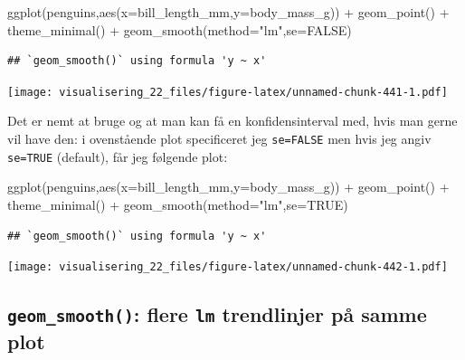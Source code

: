 \documentclass[
]{book}
\newenvironment{Shaded}{\begin{snugshade}}{\end{snugshade}}
\newcommand{\AttributeTok}[1]{\textcolor[rgb]{0.77,0.63,0.00}{#1}}
\newcommand{\ConstantTok}[1]{\textcolor[rgb]{0.00,0.00,0.00}{#1}}
\newcommand{\FunctionTok}[1]{\textcolor[rgb]{0.00,0.00,0.00}{#1}}
\newcommand{\NormalTok}[1]{#1}
\newcommand{\SpecialCharTok}[1]{\textcolor[rgb]{0.00,0.00,0.00}{#1}}
\newcommand{\StringTok}[1]{\textcolor[rgb]{0.31,0.60,0.02}{#1}}
\begin{document}
\begin{Shaded}
\begin{Highlighting}[]
\FunctionTok{ggplot}\NormalTok{(penguins,}\FunctionTok{aes}\NormalTok{(}\AttributeTok{x=}\NormalTok{bill\_length\_mm,}\AttributeTok{y=}\NormalTok{body\_mass\_g)) }\SpecialCharTok{+} 
  \FunctionTok{geom\_point}\NormalTok{() }\SpecialCharTok{+} 
  \FunctionTok{theme\_minimal}\NormalTok{() }\SpecialCharTok{+} 
  \FunctionTok{geom\_smooth}\NormalTok{(}\AttributeTok{method=}\StringTok{"lm"}\NormalTok{,}\AttributeTok{se=}\ConstantTok{FALSE}\NormalTok{)}
\end{Highlighting}
\end{Shaded}

\begin{verbatim}
## `geom_smooth()` using formula 'y ~ x'
\end{verbatim}

\texttt{[image: visualisering\_22\_files/figure-latex/unnamed-chunk-441-1.pdf]}

Det er nemt at bruge og at man kan få en konfidensinterval med, hvis man gerne vil have den: i ovenstående plot specificeret jeg \texttt{se=FALSE} men hvis jeg angiv \texttt{se=TRUE} (default), får jeg følgende plot:

\begin{Shaded}
\begin{Highlighting}[]
\FunctionTok{ggplot}\NormalTok{(penguins,}\FunctionTok{aes}\NormalTok{(}\AttributeTok{x=}\NormalTok{bill\_length\_mm,}\AttributeTok{y=}\NormalTok{body\_mass\_g)) }\SpecialCharTok{+} 
  \FunctionTok{geom\_point}\NormalTok{() }\SpecialCharTok{+} 
  \FunctionTok{theme\_minimal}\NormalTok{() }\SpecialCharTok{+} 
  \FunctionTok{geom\_smooth}\NormalTok{(}\AttributeTok{method=}\StringTok{"lm"}\NormalTok{,}\AttributeTok{se=}\ConstantTok{TRUE}\NormalTok{)}
\end{Highlighting}
\end{Shaded}

\begin{verbatim}
## `geom_smooth()` using formula 'y ~ x'
\end{verbatim}

\texttt{[image: visualisering\_22\_files/figure-latex/unnamed-chunk-442-1.pdf]}

\hypertarget{geom_smooth-flere-lm-trendlinjer-puxe5-samme-plot}{%
\subsection{\texorpdfstring{\texttt{geom\_smooth()}: flere \texttt{lm} trendlinjer på samme plot}{geom\_smooth(): flere lm trendlinjer på samme plot}}\label{geom_smooth-flere-lm-trendlinjer-puxe5-samme-plot}}
\end{document}
